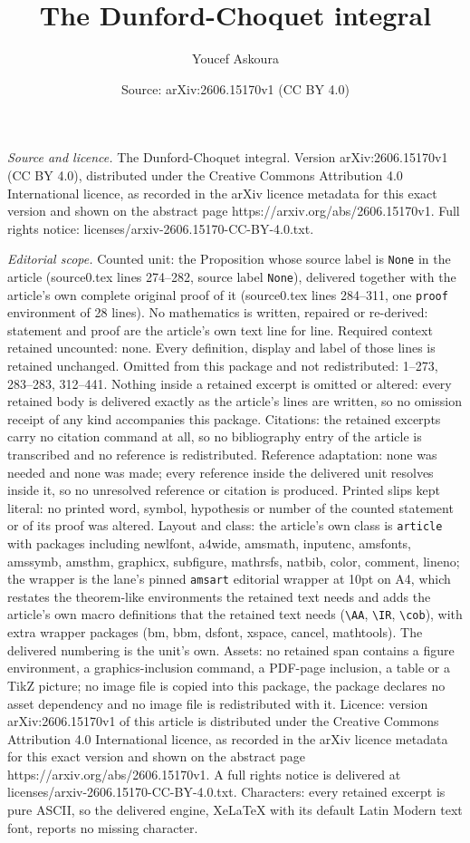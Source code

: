 \documentclass[10pt,a4paper]{amsart}
\title[The Dunford-Choquet integral]{The Dunford-Choquet integral}
\author{Youcef Askoura}
\date{Source: arXiv:2606.15170v1 (CC BY 4.0)}
\begin{document}
\maketitle

\noindent\emph{Source and licence.} The Dunford-Choquet integral. Version arXiv:2606.15170v1 (CC BY 4.0), distributed under the Creative Commons Attribution 4.0 International licence, as recorded in the arXiv licence metadata for this exact version and shown on the abstract page https://arxiv.org/abs/2606.15170v1. Full rights notice: licenses/arxiv-2606.15170-CC-BY-4.0.txt.\par\smallskip

\noindent\textit{Editorial scope.} Counted unit: the Proposition whose source label is \texttt{None} in the article (source0.tex lines 274--282, source label \texttt{None}), delivered together with the article's own complete original proof of it (source0.tex lines 284--311, one \texttt{proof} environment of 28 lines). No mathematics is written, repaired or re-derived: statement and proof are the article's own text line for line. Required context retained uncounted: none. Every definition, display and label of those lines is retained unchanged. Omitted from this package and not redistributed: 1--273, 283--283, 312--441. Nothing inside a retained excerpt is omitted or altered: every retained body is delivered exactly as the article's lines are written, so no omission receipt of any kind accompanies this package. Citations: the retained excerpts carry no citation command at all, so no bibliography entry of the article is transcribed and no reference is redistributed. Reference adaptation: none was needed and none was made; every reference inside the delivered unit resolves inside it, so no unresolved reference or citation is produced. Printed slips kept literal: no printed word, symbol, hypothesis or number of the counted statement or of its proof was altered. Layout and class: the article's own class is \texttt{article} with packages including newlfont, a4wide, amsmath, inputenc, amsfonts, amssymb, amsthm, graphicx, subfigure, mathrsfs, natbib, color, comment, lineno; the wrapper is the lane's pinned \texttt{amsart} editorial wrapper at 10pt on A4, which restates the theorem-like environments the retained text needs and adds the article's own macro definitions that the retained text needs (\texttt{\textbackslash AA}, \texttt{\textbackslash IR}, \texttt{\textbackslash cob}), with extra wrapper packages (bm, bbm, dsfont, xspace, cancel, mathtools). The delivered numbering is the unit's own. Assets: no retained span contains a figure environment, a graphics-inclusion command, a PDF-page inclusion, a table or a TikZ picture; no image file is copied into this package, the package declares no asset dependency and no image file is redistributed with it. Licence: version arXiv:2606.15170v1 of this article is distributed under the Creative Commons Attribution 4.0 International licence, as recorded in the arXiv licence metadata for this exact version and shown on the abstract page https://arxiv.org/abs/2606.15170v1. A full rights notice is delivered at licenses/arxiv-2606.15170-CC-BY-4.0.txt. Characters: every retained excerpt is pure ASCII, so the delivered engine, XeLaTeX with its default Latin Modern text font, reports no missing character.
\end{document}
